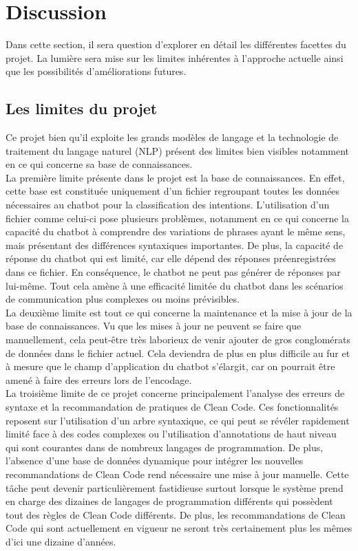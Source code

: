 \documentclass{rapport}
\begin{document}
\newpage
\section{Discussion}
Dans cette section, il sera question d'explorer en détail les différentes facettes du projet. La lumière sera mise sur les limites inhérentes à l'approche actuelle ainsi que les possibilités d'améliorations futures.
\subsection{Les limites du projet}
Ce projet bien qu'il exploite les grands modèles de langage et la technologie de traitement du langage naturel (NLP) présent des limites bien visibles notamment en ce qui concerne sa base de connaissances.\\

La première limite présente dans le projet est la base de connaissances. En effet, cette base est constituée uniquement d'un fichier regroupant toutes les données nécessaires au chatbot pour la classification des intentions. L'utilisation d'un fichier comme celui-ci pose plusieurs problèmes, notamment en ce qui concerne la capacité du chatbot à comprendre des variations de phrases ayant le même sens, mais présentant des différences syntaxiques importantes. De plus, la capacité de réponse du chatbot qui est limité, car elle dépend des réponses préenregistrées dans ce fichier. En conséquence, le chatbot ne peut pas générer de réponses par lui-même. Tout cela amène à une efficacité limitée du chatbot dans les scénarios de communication plus complexes ou moins prévisibles.\\

La deuxième limite est tout ce qui concerne la maintenance et la mise à jour de la base de connaissances. Vu que les mises à jour ne peuvent se faire que manuellement, cela peut-être très laborieux de venir ajouter de gros conglomérats de données dans le fichier actuel. Cela deviendra de plus en plus difficile au fur et à mesure que le champ d'application du chatbot s'élargit, car on pourrait être amené à faire des erreurs lors de l'encodage.\\

La troisième limite de ce projet concerne principalement l'analyse des erreurs de syntaxe et la recommandation de pratiques de Clean Code. Ces fonctionnalités reposent sur l'utilisation d'un arbre syntaxique, ce qui peut se révéler rapidement limité face à des codes complexes ou l'utilisation d’annotations de haut niveau qui sont courantes dans de nombreux langages de programmation. De plus, l'absence d'une base de données dynamique pour intégrer les nouvelles recommandations de Clean Code rend nécessaire une mise à jour manuelle. Cette tâche peut devenir particulièrement fastidieuse surtout lorsque le système prend en charge des dizaines de langages de programmation différents qui possèdent tout des règles de Clean Code différents. De plus, les recommandations de Clean Code qui sont actuellement en vigueur ne seront très certainement plus les mêmes d'ici une dizaine d'années.\\
\end{document}
